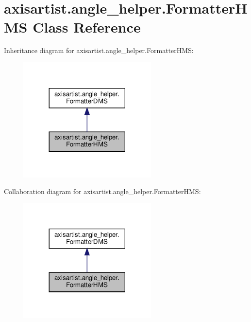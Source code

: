 \hypertarget{classaxisartist_1_1angle__helper_1_1FormatterHMS}{}\section{axisartist.\+angle\+\_\+helper.\+Formatter\+H\+MS Class Reference}
\label{classaxisartist_1_1angle__helper_1_1FormatterHMS}


Inheritance diagram for axisartist.\+angle\+\_\+helper.\+Formatter\+H\+MS\+:
\nopagebreak
\begin{figure}[H]
\begin{center}
\leavevmode
\includegraphics[width=197pt]{classaxisartist_1_1angle__helper_1_1FormatterHMS__inherit__graph}
\end{center}
\end{figure}


Collaboration diagram for axisartist.\+angle\+\_\+helper.\+Formatter\+H\+MS\+:
\nopagebreak
\begin{figure}[H]
\begin{center}
\leavevmode
\includegraphics[width=197pt]{classaxisartist_1_1angle__helper_1_1FormatterHMS__coll__graph}
\end{center}
\end{figure}
